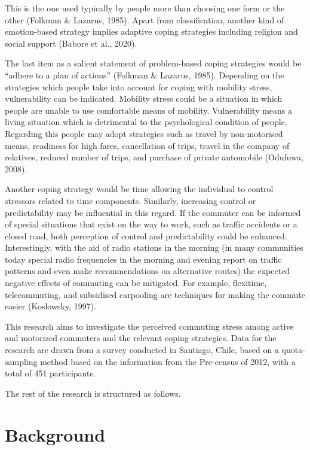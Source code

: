 \documentclass[
11pt, %
oneside, %
english, %
singlespacing, %
]{macthesis} %
\begin{document}
This is the one used typically by people more than choosing one form or the other (Folkman \& Lazarus, 1985). Apart from classification, another kind of emotion-based strategy implies adaptive coping strategies including religion and social support (Babore et al., 2020).

The last item as a salient statement of problem-based coping strategies would be ``adhere to a plan of actions'' (Folkman \& Lazarus, 1985). Depending on the strategies which people take into account for coping with mobility stress, vulnerability can be indicated. Mobility stress could be a situation in which people are unable to use comfortable means of mobility. Vulnerability means a living situation which is detrimental to the psychological condition of people. Regarding this people may adopt strategies such as travel by non-motorised means, readiness for high fares, cancellation of trips, travel in the company of relatives, reduced number of trips, and purchase of private automobile (Odufuwa, 2008).

Another coping strategy would be time allowing the individual to control stressors related to time components. Similarly, increasing control or predictability may be influential in this regard. If the commuter can be informed of special situations that exist on the way to work, such as traffic accidents or a closed road, both perception of control and predictability could be enhanced. Interestingly, with the aid of radio stations in the morning (in many communities today special radio frequencies in the morning and evening report on traffic patterns and even make recommendations on alternative routes) the expected negative effects of commuting can be mitigated. For example, flexitime, telecommuting, and subsidised carpooling are techniques for making the commute easier (Koslowsky, 1997).

This research aims to investigate the perceived commuting stress among active and motorized commuters and the relevant coping strategies. Data for the research are drawn from a survey conducted in Santiago, Chile, based on a quota-sampling method based on the information from the Pre-census of 2012, with a total of 451 participants.

The rest of the research is structured as follows.

\hypertarget{background-1}{%
\section{Background}\label{background-1}}
\end{document}
